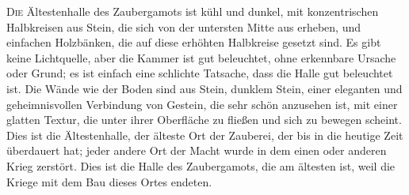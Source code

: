
\lettrine{D}{ie} Ältestenhalle des Zaubergamots ist kühl und dunkel, mit konzentrischen Halbkreisen aus Stein, die sich von der untersten Mitte aus erheben, und einfachen Holzbänken, die auf diese erhöhten Halbkreise gesetzt sind. Es gibt keine Lichtquelle, aber die Kammer ist gut beleuchtet, ohne erkennbare Ursache oder Grund; es ist einfach eine schlichte Tatsache, dass die Halle gut beleuchtet ist. Die Wände wie der Boden sind aus Stein, dunklem Stein, einer eleganten und geheimnisvollen Verbindung von Gestein, die sehr schön anzusehen ist, mit einer glatten Textur, die unter ihrer Oberfläche zu fließen und sich zu bewegen scheint. Dies ist die Ältestenhalle, der älteste Ort der Zauberei, der bis in die heutige Zeit überdauert hat; jeder andere Ort der Macht wurde in dem einen oder anderen Krieg zerstört. Dies ist die Halle des Zaubergamots, die am ältesten ist, weil die Kriege mit dem Bau dieses Ortes endeten.

